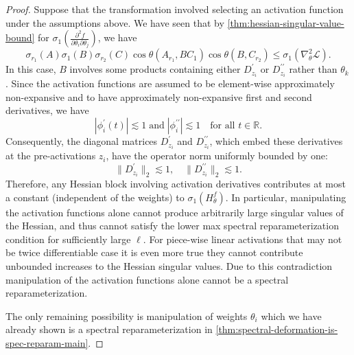 \documentclass{article}
\newcommand{\prinangle}{\cos\theta}
\theoremstyle{plain}
\theoremstyle{definition}
\theoremstyle{remark}
\begin{document}
\begin{proof}
Suppose that the transformation involved selecting an activation function under the assumptions above. We have seen that by \cref{thm:hessian-singular-value-bound} for $\sigma_1(\frac{\partial^2f}{\partial \theta_i \partial \theta_j})$, we have \[
\sigma_{r_1}(A)\sigma_1(B) \sigma_{r_2}(C)\prinangle(A_{r_1},BC_1) \prinangle(B,C_{r_2})  \leq \sigma_1(\nabla^2_{\theta}\mathcal{L} ).
\] In this case, $B$ involves some products containing either $D^{\prime}_{z_i}$ or $D^{\prime\prime}_{z_i}$ rather than $\theta_k$. 
Since the activation functions are assumed to be element-wise approximately non-expansive and to have approximately non-expansive first and second derivatives, we have \[
    |\phi^{\prime}_i(t)| \lesssim 1 \; \mathrm{and} \; |\phi^{\prime\prime}_i| \lesssim 1 \quad \text{for all } t\in \mathbb{R}.
\]
Consequently, the diagonal matrices $D^{\prime}_{z_i}$ and $D^{\prime\prime}_{z_i}$, which embed these derivatives at the pre-activations $z_i$, have the operator norm uniformly bounded by one: \[
\|D^{\prime}_{z_i}\|_2 \lesssim 1, \quad \|D^{\prime\prime}_{z_i}\|_2 \lesssim 1.
\]
Therefore, any Hessian block involving activation derivatives contributes at most a constant (independent of the weights) to $\sigma_1(H_{\theta}^f)$. In particular, manipulating the activation functions alone cannot produce arbitrarily large singular values of the Hessian, and thus cannot satisfy the lower max spectral reparameterization condition for sufficiently large $\ell$. For piece-wise linear activations that may not be twice differentiable case it is even more true they cannot contribute unbounded increases to the Hessian singular values.  Due to this contradiction manipulation of the activation functions alone cannot be a spectral reparameterization.

The only remaining possibility is manipulation of weights $\theta_i$ which we have already shown is a spectral reparameterization in \cref{thm:spectral-deformation-is-spec-reparam-main}.
\end{proof}
\end{document}
